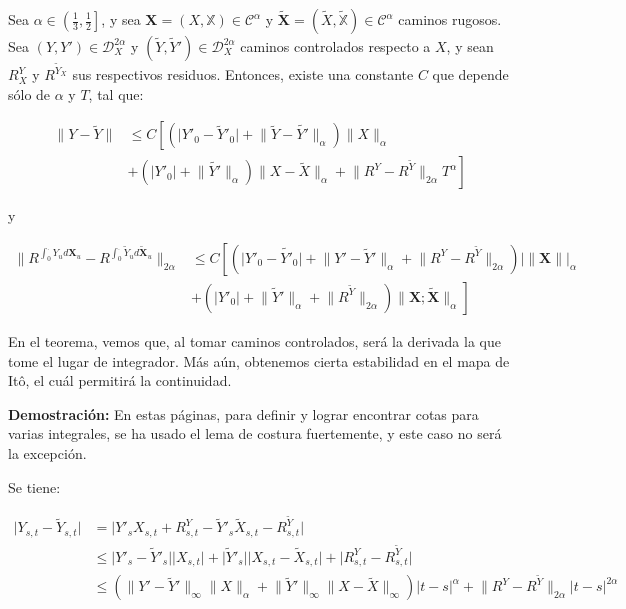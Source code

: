 \begin{theorem}
	Sea $\alpha \in \left( \frac{1}{3}, \frac{1}{2} \right]$, y sea $\mathbf{X} = (X, \mathbb{X}) \in \mathscr{C}^{\alpha}$ y $\tilde{ \mathbf{X} } = ( \tilde{X}, \tilde{ \mathbb{X} } ) \in \mathscr{C}^{\alpha}$ caminos rugosos. Sea $(Y, Y') \in \mathscr{D}_X^{2 \alpha}$ y $(\tilde{Y}, \tilde{Y}') \in \mathscr{D}_X^{2\alpha}$ caminos controlados respecto a $X$, y sean $R^Y_X$ y $R^{\tilde{Y}_X}$ sus respectivos residuos. Entonces, existe una constante $C$ que depende sólo de $\alpha$ y $T$, tal que:

	\begin{align*}
		 \lVert Y - \tilde{Y} \rVert &\leq C \left[ \left( \lvert Y'_0 - \tilde{Y}'_0 \rvert + \lVert \tilde{Y} - \tilde{Y'} \rVert_{\alpha} \right) \lVert X \rVert_{\alpha} \right. \\ 
		 &+ \left. \left( \lvert Y'_0 \rvert + \lVert \tilde{Y'} \rVert_{\alpha}  \right) \lVert X - \tilde{X} \rVert_{\alpha} + \lVert R^Y - R^{\tilde{Y}} \rVert_{2\alpha}  T^{\alpha} \right]
	\end{align*}

	y

	\begin{align*}
		\lVert R^{ \int_0^{\cdot} Y_u d \mathbf{X}_u } - R^{ \int_0^{\cdot} \tilde{Y}_u d \mathbf{\tilde{X}}_u } \rVert_{2 \alpha} &\leq C \left[  \left(  \lvert Y'_0 - \tilde{Y'}_0 \rvert + \lVert Y' - \tilde{Y}' \rVert_{\alpha} + \lVert R^Y - R^{\tilde{Y}} \rVert_{2\alpha} \right) \lvert \lVert  \mathbf{X} \rVert \rvert_{\alpha} \right. \\
		&+ \left. \left(  \lvert Y'_0 \rvert + \lVert \tilde{Y}' \rVert_{\alpha} +  \lVert R^{\tilde{Y}} \rVert_{2\alpha} \right) \lVert \mathbf{X}; \mathbf{\tilde{X}} \rVert_{\alpha} \right]
	\end{align*}
\end{theorem}

En el teorema, vemos que, al tomar caminos controlados, será la derivada la que tome el lugar de integrador. Más aún, obtenemos cierta estabilidad en el mapa de Itô, el cuál permitirá la continuidad.

\textbf{Demostración:} En estas páginas, para definir y lograr encontrar cotas para varias integrales, se ha usado el lema de costura fuertemente, y este caso no será la excepción.

Se tiene:

\begin{align*}
	\lvert Y_{s,t} - \tilde{Y}_{s,t} \rvert &= \lvert Y'_s X_{s,t} + R^Y_{s,t} - \tilde{Y}'_s \tilde{X}_{s,t} - R^{\tilde{Y}}_{s,t} \rvert \\
	&\leq \lvert Y'_s - \tilde{Y}'_s \rvert \lvert  X_{s,t} \rvert + \lvert \tilde{Y}'_s \rvert \lvert X_{s,t} - \tilde{X}_{s,t} \rvert + \lvert R^Y_{s,t} - R^{\tilde{Y}}_{s,t} \rvert \\
	&\leq \left(  \lVert Y' - \tilde{Y}' \rVert_{\infty} \lVert X \rVert_{\alpha} + \lVert \tilde{Y}' \rVert_{\infty} \lVert X - \tilde{X} \rVert_{ \infty } \right) \lvert t - s \rvert^{\alpha} + \lVert R^Y - R^{\tilde{Y}} \rVert_{2\alpha} \lvert t - s \rvert^{2 \alpha}
\end{align*}

